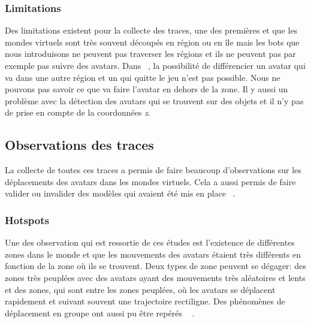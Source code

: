  		\subsubsection{Limitations}
	Des limitations existent pour la collecte des traces, une des premières et que les mondes virtuels sont très souvent découpés en région ou en île mais les bots que nous introduisons ne peuvent pas traverser les régions et ils ne peuvent pas par exemple pas suivre des avatars. Dans ~\cite{DBLP:journals/corr/abs-0807-2328}, la possibilité de différencier un avatar qui va dans une autre région et un qui quitte le jeu n'est pas possible. Nous ne pouvons pas savoir ce que va faire l'avatar en dehors de la zone. Il y aussi un problème avec la détection des avatars qui se trouvent sur des objets et il n'y pas de prise en compte de la coordonnées \textit{z}.

	\subsection{Observations des traces}
	 La collecte de toutes ces traces a permis de faire beaucoup d'observations sur les déplacements des avatars dans les mondes virtuels. Cela a aussi permis de faire valider ou invalider des modèles qui avaient été mis en place ~\cite{DBLP:journals/corr/abs-0807-2328}. 
		\subsubsection{Hotspots}
	Une des observation qui est ressortie de ces études est l'existence de différentes zones dans le monde et que les mouvements des avatars étaient très différents en fonction de la zone où ils se trouvent. Deux types de zone peuvent se dégager: des zones très peuplées avec des avatars ayant des mouvements très aléatoires et lents et des zones, qui sont entre les zones peuplées, où les avatars se déplacent rapidement et suivant souvent une trajectoire rectiligne. Des phénomènes de déplacement en groupe ont aussi pu être repérés ~\cite{15141312} . \\
